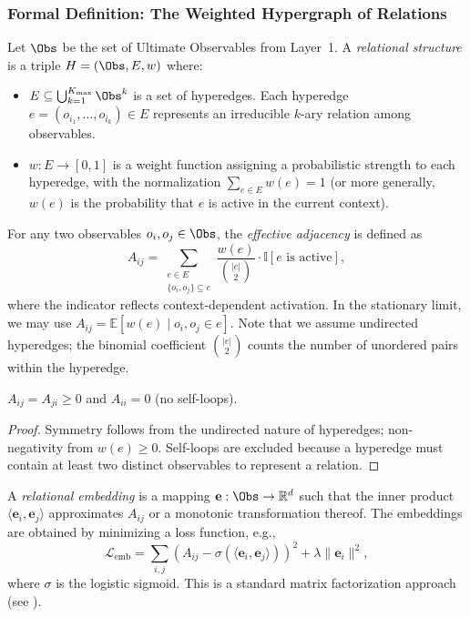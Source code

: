 \subsubsection{Formal Definition: The Weighted Hypergraph of Relations}
\begin{definition}
Let $\Obs$ be the set of Ultimate Observables from Layer~1. A \emph{relational structure} is a triple $H = (\Obs, E, w)$ where:
\begin{itemize}
    \item $E \subseteq \bigcup_{k=1}^{K_{\max}} \Obs^k$ is a set of hyperedges. Each hyperedge $e = (o_{i_1}, \dots, o_{i_k}) \in E$ represents an irreducible $k$-ary relation among observables.
    \item $w: E \to [0,1]$ is a weight function assigning a probabilistic strength to each hyperedge, with the normalization $\sum_{e \in E} w(e) = 1$ (or more generally, $w(e)$ is the probability that $e$ is active in the current context).
\end{itemize}
\end{definition}

\begin{definition}
For any two observables $o_i, o_j \in \Obs$, the \emph{effective adjacency} is defined as
\[
A_{ij} = \sum_{\substack{e \in E \\ \{o_i, o_j\} \subseteq e}} \frac{w(e)}{\binom{|e|}{2}} \cdot \mathbb{I}[\text{$e$ is active}],
\]
where the indicator reflects context-dependent activation. In the stationary limit, we may use $A_{ij} = \mathbb{E}[w(e) \mid o_i, o_j \in e]$. Note that we assume undirected hyperedges; the binomial coefficient $\binom{|e|}{2}$ counts the number of unordered pairs within the hyperedge.
\end{definition}

\begin{lemma}
$A_{ij} = A_{ji} \ge 0$ and $A_{ii} = 0$ (no self-loops).
\end{lemma}
\begin{proof}
Symmetry follows from the undirected nature of hyperedges; non-negativity from $w(e) \ge 0$. Self-loops are excluded because a hyperedge must contain at least two distinct observables to represent a relation.
\end{proof}

\begin{definition}
A \emph{relational embedding} is a mapping $\mathbf{e}: \Obs \to \mathbb{R}^d$ such that the inner product $\langle \mathbf{e}_i, \mathbf{e}_j \rangle$ approximates $A_{ij}$ or a monotonic transformation thereof. The embeddings are obtained by minimizing a loss function, e.g.,
\[
\mathcal{L}_{\text{emb}} = \sum_{i,j} \left( A_{ij} - \sigma(\langle \mathbf{e}_i, \mathbf{e}_j \rangle) \right)^2 + \lambda \|\mathbf{e}_i\|^2,
\]
where $\sigma$ is the logistic sigmoid. This is a standard matrix factorization approach (see \cite{pennington2014glove}).
\end{definition}

